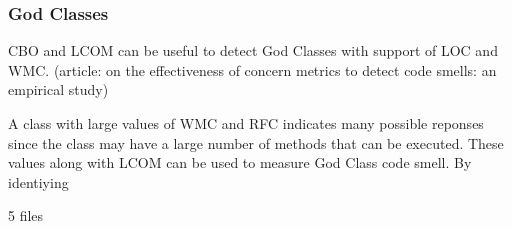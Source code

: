 \subsubsection{God Classes}
CBO and LCOM can be useful to detect God Classes with support of LOC and WMC. (article: on the effectiveness of concern metrics to detect code smells: an empirical study)

A class with large values of WMC and RFC indicates many possible reponses since the class may have a large number of methods that can be executed. These values along with LCOM can be used to measure God Class code smell. By identiying 

5 files











































